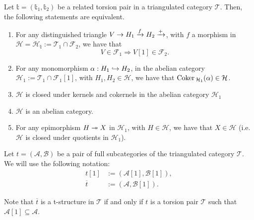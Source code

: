 \begin{thm}\label{thm:2.9}
  Let $\mathbb{t}=(\mathbb{t}_1,\mathbb{t}_2)$ be a related torsion pair in a triangulated
  category $\mathcal{T}$. Then, the following statements are equivalent.
  \begin{enumerate}[label=(\alph*)]
    \item For any distinguished triangle $V\to H_1\xrightarrow{f}H_2\xrightarrow{+}$, with
      $f$ a morphism in $\mathcal{H}=\mathcal{H}_\mathbb{t}:=\mathcal{T}_1\cap\mathcal{F}_2$,
      we have that
      \begin{equation*}
        V\in\mathcal{F}_1 \Rightarrow V[1]\in\mathcal{F}_2.
      \end{equation*}
    \item For any monomorphism $\alpha:H_1\hookrightarrow H_2$, in the abelian category
      $\mathcal{H}_1:=\mathcal{T}_1\cap\mathcal{F}_1[1]$, with $H_1,H_2\in\mathcal{H}$,
      we have that $\mathrm{\textup{Coker\,}}_{\mathcal{H}_1}(\alpha)\in\mathcal{H}$.
    \item $\mathcal{H}$ is closed under kernels and cokernels in the abelian category
      $\mathcal{H}_1$
    \item $\mathcal{H}$ is an abelian category.
    \item For any epimorphism $H\twoheadrightarrow X$ in $\mathcal{H}_1$, with $H\in\mathcal{H}$,
      we have that $X\in\mathcal{H}$ (i.e. $\mathcal{H}$ is closed under quotients in $\mathcal{H}_1$).
  \end{enumerate}
\end{thm}

Let $t=(\mathcal{A},\mathcal{B})$ be a pair of full subcategories of the triangulated
category $\mathcal{T}$. We will use the following notation:
\begin{align*}
  t[1] &:= (\mathcal{A}[1],\mathcal{B}[1]),\\
  \overline{t} &:= (\mathcal{A},\mathcal{B}[1]).
\end{align*}

Note that $\overline{t}$ is a t-structure in $\mathcal{T}$ if and only if $t$ is a torsion
pair $\mathcal{T}$ such that $\mathcal{A}[1]\subseteq\mathcal{A}$.


